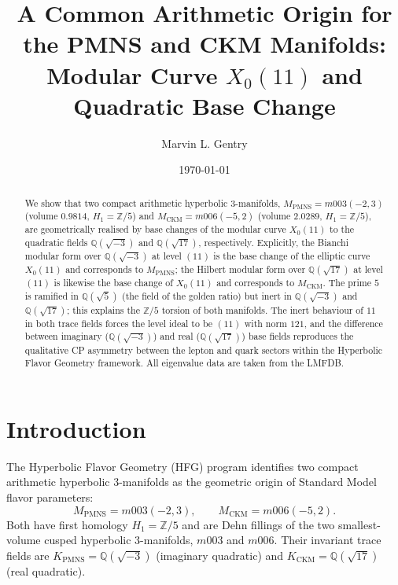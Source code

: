 \documentclass[11pt,a4paper]{article}
\theoremstyle{definition}
\newcommand{\QQ}{\mathbb{Q}}
\newcommand{\ZZ}{\mathbb{Z}}
\newcommand{\MPMNS}{M_{\mathrm{PMNS}}}
\newcommand{\MCKM}{M_{\mathrm{CKM}}}
\newcommand{\Kpmns}{K_{\mathrm{PMNS}}}
\newcommand{\Kckm}{K_{\mathrm{CKM}}}
\begin{document}
\title{A Common Arithmetic Origin for the PMNS and CKM Manifolds:\\
Modular Curve \(X_0(11)\) and Quadratic Base Change}

\author[1]{Marvin L. Gentry}
\date{\today}

\begin{abstract}
We show that two compact arithmetic hyperbolic 3-manifolds,
$\MPMNS = m003(-2,3)$ (volume $0.9814$, $H_1=\ZZ/5$) and
$\MCKM = m006(-5,2)$ (volume $2.0289$, $H_1=\ZZ/5$), are
geometrically realised by base changes of the modular curve
$X_0(11)$ to the quadratic fields $\QQ(\sqrt{-3})$ and $\QQ(\sqrt{17})$,
respectively.
Explicitly, the Bianchi modular form over $\QQ(\sqrt{-3})$ at level
$(11)$ is the base change of the elliptic curve $X_0(11)$ and corresponds
to $\MPMNS$; the Hilbert modular form over $\QQ(\sqrt{17})$ at level
$(11)$ is likewise the base change of $X_0(11)$ and corresponds to
$\MCKM$.
The prime $5$ is ramified in $\QQ(\sqrt{5})$ (the field of the golden
ratio) but inert in $\QQ(\sqrt{-3})$ and $\QQ(\sqrt{17})$; this explains
the $\ZZ/5$ torsion of both manifolds.
The inert behaviour of $11$ in both trace fields forces the level ideal
to be $(11)$ with norm $121$, and the difference between imaginary
($\QQ(\sqrt{-3})$) and real ($\QQ(\sqrt{17})$) base fields reproduces
the qualitative CP asymmetry between the lepton and quark sectors
within the Hyperbolic Flavor Geometry framework.
All eigenvalue data are taken from the LMFDB.
\end{abstract}

\section{Introduction}
\label{sec:intro}

The Hyperbolic Flavor Geometry (HFG) program
\cite{Gentry:Unified} identifies two compact arithmetic hyperbolic
3-manifolds as the geometric origin of Standard Model flavor
parameters:
\[
\MPMNS = m003(-2,3),\qquad
\MCKM = m006(-5,2).
\]
Both have first homology $H_1 = \ZZ/5$ and are Dehn fillings of the
two smallest-volume cusped hyperbolic 3-manifolds, $m003$ and $m006$.
Their invariant trace fields are $\Kpmns = \QQ(\sqrt{-3})$ (imaginary
quadratic) and $\Kckm = \QQ(\sqrt{17})$ (real quadratic).
\end{document}
